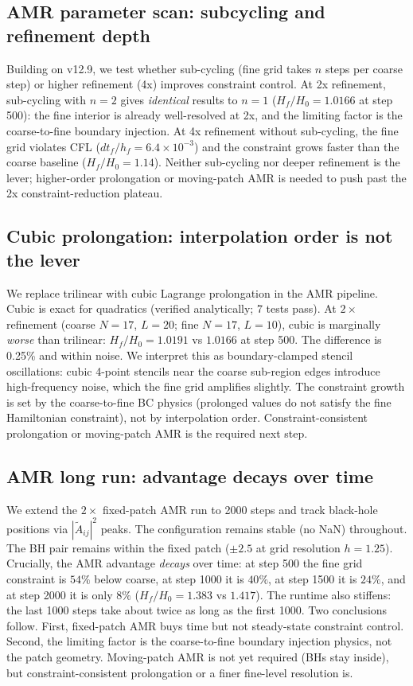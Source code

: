 \subsection{AMR parameter scan: subcycling and refinement depth}

Building on v12.9, we test whether sub-cycling (fine grid takes $n$ steps per coarse step) or higher refinement (4x) improves constraint control. At 2x refinement, sub-cycling with $n=2$ gives \emph{identical} results to $n=1$ ($H_f/H_0 = 1.0166$ at step 500): the fine interior is already well-resolved at 2x, and the limiting factor is the coarse-to-fine boundary injection. At 4x refinement without sub-cycling, the fine grid violates CFL ($dt_f/h_f = 6.4\times 10^{-3}$) and the constraint grows faster than the coarse baseline ($H_f/H_0 = 1.14$). Neither sub-cycling nor deeper refinement is the lever; higher-order prolongation or moving-patch AMR is needed to push past the 2x constraint-reduction plateau.

\subsection{Cubic prolongation: interpolation order is not the lever}

We replace trilinear with cubic Lagrange prolongation in the AMR pipeline. Cubic is exact for quadratics (verified analytically; 7 tests pass). At $2\times$ refinement (coarse $N=17$, $L=20$; fine $N=17$, $L=10$), cubic is marginally \emph{worse} than trilinear: $H_f/H_0 = 1.0191$ vs $1.0166$ at step 500. The difference is 0.25\% and within noise. We interpret this as boundary-clamped stencil oscillations: cubic 4-point stencils near the coarse sub-region edges introduce high-frequency noise, which the fine grid amplifies slightly. The constraint growth is set by the coarse-to-fine BC physics (prolonged values do not satisfy the fine Hamiltonian constraint), not by interpolation order. Constraint-consistent prolongation or moving-patch AMR is the required next step.

\subsection{AMR long run: advantage decays over time}

We extend the $2\times$ fixed-patch AMR run to 2000 steps and track black-hole positions via $|\tilde A_{ij}|^2$ peaks. The configuration remains stable (no NaN) throughout. The BH pair remains within the fixed patch ($\pm 2.5$ at grid resolution $h=1.25$). Crucially, the AMR advantage \emph{decays} over time: at step 500 the fine grid constraint is $54\%$ below coarse, at step 1000 it is $40\%$, at step 1500 it is $24\%$, and at step 2000 it is only $8\%$ ($H_f/H_0 = 1.383$ vs $1.417$). The runtime also stiffens: the last 1000 steps take about twice as long as the first 1000. Two conclusions follow. First, fixed-patch AMR buys time but not steady-state constraint control. Second, the limiting factor is the coarse-to-fine boundary injection physics, not the patch geometry. Moving-patch AMR is not yet required (BHs stay inside), but constraint-consistent prolongation or a finer fine-level resolution is.

